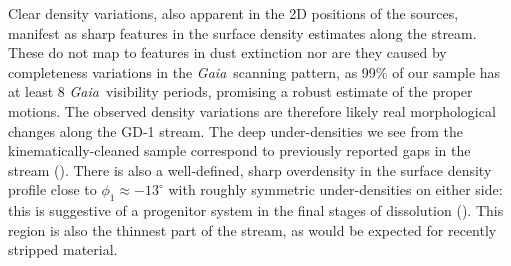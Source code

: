 \documentclass[modern]{aastex62}
\newcommand{\gaia}{\textsl{Gaia}}
\newcommand{\masyr}{\ensuremath{\textrm{mas}~\textrm{yr}^{-1}}}
\begin{document}
Clear density variations, also apparent in the 2D positions of the sources,
manifest as sharp features in the surface density estimates along the stream.
These do not map to features in dust extinction nor are they caused by completeness variations
in the \gaia\ scanning pattern, as 99\% of our sample has at least 8 \gaia\ visibility periods, 
promising a robust estimate of the proper motions.
The observed density variations are therefore likely real morphological changes
along the GD-1 stream.
The deep under-densities we see from the kinematically-cleaned sample correspond
to previously reported gaps in the stream (\citealt{Carlberg:2013, DeBoer:2018}).
There is also a well-defined, sharp overdensity in the surface density profile
close to $\phi_1 \approx -13^\circ$ with roughly symmetric under-densities on
either side:
this is suggestive of a progenitor system in the final stages of dissolution
(\citealt{Balbinot:2018}).
This region is also the thinnest part of the stream, as would be expected for
recently stripped material.
\end{document}
